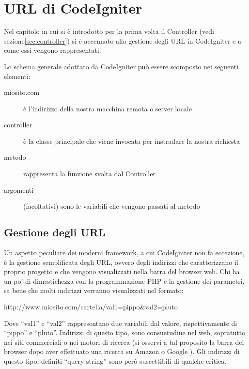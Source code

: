 \chapter{URL di CodeIgniter}
\label{cap:urlr}

Nel capitolo in cui si è introdotto per la prima volta il Controller (vedi sezione\vref{sec:controller}) si è accennato alla gestione degli \ac{URL} in CodeIgniter e a come essi vengono rappresentati.

Lo schema generale adottato da CodeIgniter può essere scomposto nei seguenti elementi:


\begin{description}
\item [miosito.com] è l'indirizzo della nostra macchina remota o server locale
\item [controller] è la classe principale che viene invocata per instradare la nostra richiesta
\item [metodo] rappresenta la funzione svolta dal Controller 
\item [argomenti] (facoltativi) sono le variabili che vengono passati al metodo
\end{description}

\section{Gestione degli URL}
Un aspetto peculiare dei moderni framework, a cui CodeIgniter non fa eccezione, è la gestione semplificata degli \ac{URL}, ovvero degli indirizzi che caratterizzano il proprio progetto e che vengono visualizzati nella barra del browser web. Chi ha un po' di dimestichezza con la programmazione \ac{PHP} e la gestione dei parametri, sa bene che molti indirizzi verranno visualizzati nel formato:

\begin{code}
http://www.miosito.com/cartella/val1=pippo&val2=pluto
\end{code}

Dove  ``val1'' e ``val2'' rappresentano due variabili dal valore, rispettivamente di ``pippo'' e ``pluto''. Indirizzi di questo tipo, sono consuetudine nel web, sopratutto nei siti commerciali o nei motori di ricerca (si osservi a tal proposito la barra del browser dopo aver effettuato una ricerca su Amazon o Google ). Gli indirizzi di questo tipo, definiti ``query string'' sono però suscettibili di qualche critica.

